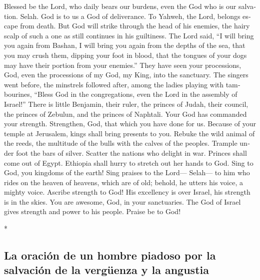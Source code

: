 \begin{paracol}{2}
\begin{otherlanguage}{english}
 Blessed be the Lord, who daily bears our burdens, even
the God who is our salvation. Selah.  God is to us a God
of deliverance. To Yahweh, the Lord, belongs escape from death.
 But God will strike through the head of his enemies, the
hairy scalp of such a one as still continues in his guiltiness.
 The Lord said, ``I will bring you again from Bashan, I
will bring you again from the depths of the sea,  that
you may crush them, dipping your foot in blood, that the tongues of your
dogs may have their portion from your enemies.''  They
have seen your processions, God, even the processions of my God, my
King, into the sanctuary.  The singers went before, the
minstrels followed after, among the ladies playing with tambourines,
 ``Bless God in the congregations, even the Lord in the
assembly of Israel!''  There is little Benjamin, their
ruler, the princes of Judah, their council, the princes of Zebulun, and
the princes of Naphtali.  Your God has commanded your
strength. Strengthen, God, that which you have done for us.
 Because of your temple at Jerusalem, kings shall bring
presents to you.  Rebuke the wild animal of the reeds,
the multitude of the bulls with the calves of the peoples. Trample under
foot the bars of silver. Scatter the nations who delight in war.
 Princes shall come out of Egypt. Ethiopia shall hurry to
stretch out her hands to God.  Sing to God, you kingdoms
of the earth! Sing praises to the Lord--- Selah---  to
him who rides on the heaven of heavens, which are of old; behold, he
utters his voice, a mighty voice.  Ascribe strength to
God! His excellency is over Israel, his strength is in the skies.
 You are awesome, God, in your sanctuaries. The God of
Israel gives strength and power to his people. Praise be to God!

\end{otherlanguage}

\switchcolumn[0]*

\hypertarget{la-oraciuxf3n-de-un-hombre-piadoso-por-la-salvaciuxf3n-de-la-verguxfcenza-y-la-angustia}{%
\subsection{La oración de un hombre piadoso por la salvación de la
vergüenza y la
angustia}\label{la-oraciuxf3n-de-un-hombre-piadoso-por-la-salvaciuxf3n-de-la-verguxfcenza-y-la-angustia}}


\end{paracol}
